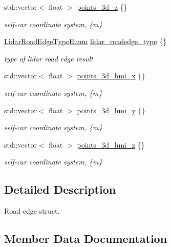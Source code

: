\begin{DoxyCompactItemize}
std\+::vector$<$ float $>$ \hyperlink{structmaf__perception__interface_1_1RoadEdge_ad15e8716b53a15933fa3f740f0c16fb6}{points\+\_\+3d\+\_\+z} \{\}
\begin{DoxyCompactList}\small\item\em self-\/car coordinate system, \{m\} \end{DoxyCompactList}\item 
\hyperlink{structmaf__perception__interface_1_1LidarRoadEdgeTypeEnum}{Lidar\+Road\+Edge\+Type\+Enum} \hyperlink{structmaf__perception__interface_1_1RoadEdge_aa56662f538f7a70d93efcf36a8dc3c14}{lidar\+\_\+roadedge\+\_\+type} \{\}
\begin{DoxyCompactList}\small\item\em type of lidar road edge result \end{DoxyCompactList}\item 
std\+::vector$<$ float $>$ \hyperlink{structmaf__perception__interface_1_1RoadEdge_a20fdf216ffbd8a7033d3575dd290fe0f}{points\+\_\+3d\+\_\+hmi\+\_\+x} \{\}
\begin{DoxyCompactList}\small\item\em self-\/car coordinate system, \{m\} \end{DoxyCompactList}\item 
std\+::vector$<$ float $>$ \hyperlink{structmaf__perception__interface_1_1RoadEdge_aa615fe40c375c34d5068da46faba68a7}{points\+\_\+3d\+\_\+hmi\+\_\+y} \{\}
\begin{DoxyCompactList}\small\item\em self-\/car coordinate system, \{m\} \end{DoxyCompactList}\item 
std\+::vector$<$ float $>$ \hyperlink{structmaf__perception__interface_1_1RoadEdge_aa4503fdc688ac4a676fac4a90b1be291}{points\+\_\+3d\+\_\+hmi\+\_\+z} \{\}
\begin{DoxyCompactList}\small\item\em self-\/car coordinate system, \{m\} \end{DoxyCompactList}\end{DoxyCompactItemize}


\subsection{Detailed Description}
Road edge struct. 

\subsection{Member Data Documentation}
\mbox{\label{structmaf__perception__interface_1_1RoadEdge_ab403daf2a34a9c292d53de837d3b9831}} 
